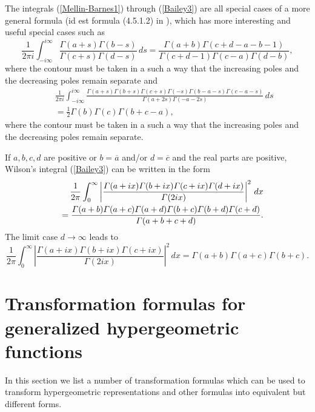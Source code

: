 \documentclass[envcountchap,graybox]{svmono}
\renewcommand{\Gamma}{\varGamma}
\begin{document}
The integrals (\ref{Mellin-Barnes1}) through (\ref{Bailey3}) are all special cases of a more
general formula (id est formula (4.5.1.2) in \cite{Slater}), which has more interesting and
useful special cases such as
\begin{equation}
\label{Slater1}
\frac{1}{2\pi i}\int_{-i\infty}^{i\infty}\frac{\Gamma(a+s)\Gamma(b-s)}{\Gamma(c+s)\Gamma(d-s)}\,ds
=\frac{\Gamma(a+b)\Gamma(c+d-a-b-1)}{\Gamma(c+d-1)\Gamma(c-a)\Gamma(d-b)},
\end{equation}
where the contour must be taken in a such a way that the increasing poles and the decreasing poles
remain separate and
\begin{eqnarray}
\label{Slater2}
& &\frac{1}{2\pi i}\int_{-i\infty}^{i\infty}
\frac{\Gamma(a+s)\Gamma(b+s)\Gamma(c+s)\Gamma(-s)\Gamma(b-a-s)\Gamma(c-a-s)}
{\Gamma(a+2s)\Gamma(-a-2s)}\,ds\nonumber\\
& &{}=\frac{1}{2}\Gamma(b)\Gamma(c)\Gamma(b+c-a),
\end{eqnarray}
where the contour must be taken in a such a way that the increasing poles and the decreasing poles
remain separate.

If $a,b,c,d$ are positive or $b=\overline{a}$ and/or $d=\overline{c}$ and the real parts are
positive, Wilson's integral (\ref{Bailey3}) can be written in the form
\begin{eqnarray}
\label{Wilson1}\index{Wilson's integral}
& &\frac{1}{2\pi}\int_0^{\infty}
\left|\frac{\Gamma(a+ix)\Gamma(b+ix)\Gamma(c+ix)\Gamma(d+ix)}{\Gamma(2ix)}\right|^2\,dx\nonumber\\
& &{}=\frac{\Gamma(a+b)\Gamma(a+c)\Gamma(a+d)\Gamma(b+c)\Gamma(b+d)\Gamma(c+d)}{\Gamma(a+b+c+d)}.
\end{eqnarray}
The limit case $d\rightarrow\infty$ leads to
\begin{equation}
\label{Wilson2}
\frac{1}{2\pi}\int_0^{\infty}
\left|\frac{\Gamma(a+ix)\Gamma(b+ix)\Gamma(c+ix)}{\Gamma(2ix)}\right|^2\,dx
=\Gamma(a+b)\Gamma(a+c)\Gamma(b+c).
\end{equation}

\section{Transformation formulas for generalized hypergeometric functions}
\par\setcounter{equation}{0}
\label{transformation formulas}

In this section we list a number of transformation formulas which can be used to
transform hypergeometric representations and other formulas into equivalent
but different forms.
\end{document}

